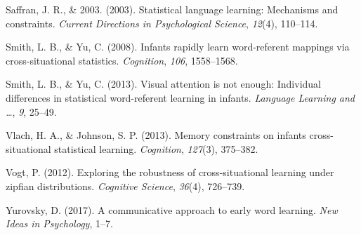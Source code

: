 \documentclass[10pt, letterpaper]{article}
\begin{document}
\hypertarget{ref-saffran2003}{}
Saffran, J. R., \& 2003. (2003). Statistical language learning:
Mechanisms and constraints. \emph{Current Directions in Psychological
Science}, \emph{12}(4), 110--114.

\hypertarget{ref-smith2008}{}
Smith, L. B., \& Yu, C. (2008). Infants rapidly learn word-referent
mappings via cross-situational statistics. \emph{Cognition}, \emph{106},
1558--1568.

\hypertarget{ref-smith2013}{}
Smith, L. B., \& Yu, C. (2013). Visual attention is not enough:
Individual differences in statistical word-referent learning in infants.
\emph{Language Learning and \ldots{}}, \emph{9}, 25--49.

\hypertarget{ref-vlach2013}{}
Vlach, H. A., \& Johnson, S. P. (2013). Memory constraints on infants
cross-situational statistical learning. \emph{Cognition}, \emph{127}(3),
375--382.

\hypertarget{ref-vogt2012}{}
Vogt, P. (2012). Exploring the robustness of cross-situational learning
under zipfian distributions. \emph{Cognitive Science}, \emph{36}(4),
726--739.

\hypertarget{ref-yurovsky2017}{}
Yurovsky, D. (2017). A communicative approach to early word learning.
\emph{New Ideas in Psychology}, 1--7.
\end{document}
